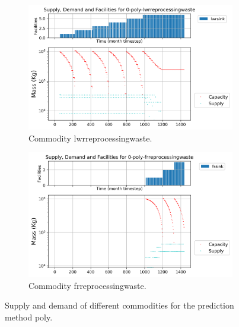 \documentclass[11pt]{article}
\begin{document}
\begin{figure}[]
	\centering
	\begin{subfigure}[t]{0.45\textwidth}
		\centering
		\includegraphics[width=\linewidth]{23-figures/0-poly-lwrreprocessingwaste.png} 
		\caption{Commodity lwrreprocessingwaste.}
		\label{fig:23-lwrreprocessingwaste}
	\end{subfigure}
	\vspace{1cm}
	\begin{subfigure}[t]{0.45\textwidth}
		\centering
		\includegraphics[width=\linewidth]{23-figures/0-poly-frreprocessingwaste.png} 
		\caption{Commodity frreprocessingwaste.}
		\label{fig:23-frreprocessingwaste}
	\end{subfigure}
	\hfill
	\caption{Supply and demand of different commodities for the prediction method poly.}
	\label{fig:23-waste}
\end{figure}
\end{document}
